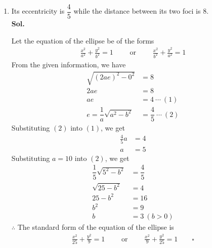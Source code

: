 \documentclass{report}
\newcommand{\sol}{\vspace{1em}\\\textbf{Sol.}}
\newcommand{\eos}{ \qquad \square}
\begin{document}
\begin{enumerate}[leftmargin=*]
\begin{enumerate}
                    \newpage
              \item Its eccentricity is $\dfrac{4}{5}$ while the distance between its two foci is
                    8. \sol{}

                    Let the equation of the ellipse be of the forms
                    \begin{align*}
                        \frac{x^2}{a^2} + \frac{y^2}{b^2} = 1\qquad \text{ or } \qquad \frac{x^2}{b^2} + \frac{y^2}{a^2} = 1
                    \end{align*}
                    From the given information, we have
                    \begin{align*}
                        \sqrt{(2ae)^2 - 0^2}             & = 8                         \\
                        2ae                              & = 8                         \\
                        ae                               & = 4\ \cdots\ (1)            \\
                        e = \dfrac{1}{a}\sqrt{a^2 - b^2} & = \dfrac{4}{5}\ \cdots\ (2)
                    \end{align*}
                    Substituting $(2)$ into $(1)$, we get
                    \begin{align*}
                        \frac{4}{5}a & = 4 \\
                        a            & = 5
                    \end{align*}
                    Substituting $a = 10$ into $(2)$, we get
                    \begin{align*}
                        \dfrac{1}{5}\sqrt{5^2 - b^2} & = \dfrac{4}{5} \\
                        \sqrt{25 - b^2}              & = 4            \\
                        25 - b^2                     & = 16           \\
                        b^2                          & = 9            \\
                        b                            & = 3\ (b > 0)
                    \end{align*}
                    $\therefore$ The standard form of the equation of the ellipse is
                    \begin{align*}
                        \frac{x^2}{25} + \frac{y^2}{9} = 1\qquad \text{ or } \qquad \frac{x^2}{9} + \frac{y^2}{25} = 1 \eos

\end{align*}
\end{enumerate}
\end{enumerate}
\end{document}
